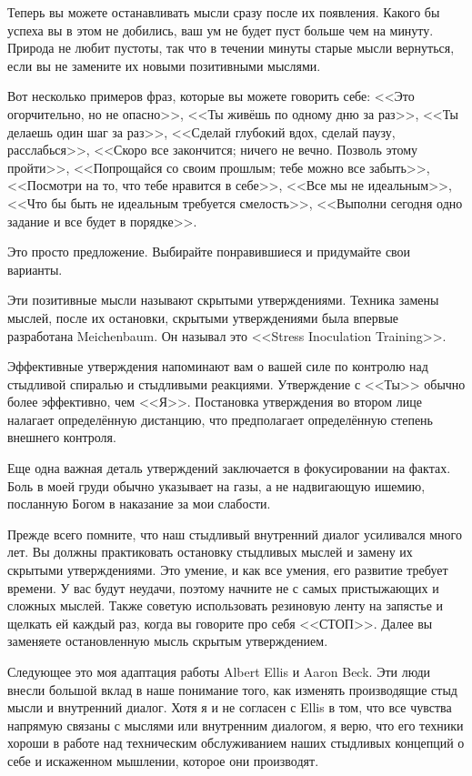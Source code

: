 \documentclass[10pt, fleqn]{article}
\begin{document}

Теперь вы можете останавливать мысли сразу после их появления. Какого бы успеха вы в этом не добились, ваш ум не будет пуст больше чем на минуту. Природа не любит пустоты, так что в течении минуты старые мысли вернуться, если вы не замените их новыми позитивными мыслями.

Вот несколько примеров фраз, которые вы можете говорить себе: <<Это огорчительно, но не опасно>>, <<Ты живёшь по одному дню за раз>>, <<Ты делаешь один шаг за раз>>, <<Сделай глубокий вдох, сделай паузу, расслабься>>, <<Скоро все закончится; ничего не вечно. Позволь этому пройти>>, <<Попрощайся со своим прошлым; тебе можно все забыть>>, <<Посмотри на то, что тебе нравится в себе>>, <<Все мы не идеальным>>, <<Что бы быть не идеальным требуется смелость>>, <<Выполни сегодня одно задание и все будет в порядке>>.

Это просто предложение. Выбирайте понравившиеся и придумайте свои варианты.

Эти позитивные мысли называют скрытыми утверждениями. Техника замены мыслей, после их остановки, скрытыми утверждениями была впервые разработана Meichenbaum. Он называл это <<Stress Inoculation Training>>.

Эффективные утверждения напоминают вам о вашей силе по контролю над стыдливой спиралью и стыдливыми реакциями. Утверждение с <<Ты>> обычно более эффективно, чем <<Я>>. Постановка утверждения во втором лице налагает определённую дистанцию, что предполагает определённую степень внешнего контроля.

Еще одна важная деталь утверждений заключается в фокусировании на фактах. Боль в моей груди обычно указывает на газы, а не надвигающую ишемию, посланную Богом в наказание за мои слабости.

Прежде всего помните, что наш стыдливый внутренний диалог усиливался много лет. Вы должны практиковать остановку стыдливых мыслей и замену их скрытыми утверждениями. Это умение, и как все умения, его развитие требует времени. У вас будут неудачи, поэтому начните не с самых пристыжающих и сложных мыслей. Также советую использовать резиновую ленту на запястье и щелкать ей каждый раз, когда вы говорите про себя <<СТОП>>. Далее вы заменяете остановленную мысль скрытым утверждением.

Следующее это моя адаптация работы Albert Ellis и Aaron Beck. Эти люди внесли большой вклад в наше понимание того, как изменять производящие стыд мысли и внутренний диалог. Хотя я и не согласен с Ellis в том, что все чувства напрямую связаны с мыслями или внутренним диалогом, я верю, что его техники хороши в работе над техническим обслуживанием наших стыдливых концепций о себе и искаженном мышлении, которое они производят.
\end{document}
